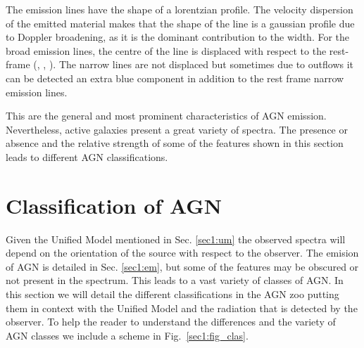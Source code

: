 The emission lines have the shape of a lorentzian profile. The velocity dispersion of the emitted material makes that the shape of the line is a gaussian profile due to Doppler broadening, as it is the dominant contribution to the width. For the broad emission lines, the centre of the line is displaced with respect to the rest-frame (\citealt{sulentic00}, \citealt{steinhardt12}, \citealt{gaskell13}). The narrow lines are not displaced but sometimes due to outflows it can be detected an extra blue component in addition to the rest frame narrow emission lines.  

This are the general and most prominent characteristics of AGN emission. Nevertheless, active galaxies present a great variety of spectra. The presence or absence and the relative strength of some of the features shown in this section leads to different AGN classifications.






\section{Classification of AGN}
\label{sec1:class}


Given the Unified Model mentioned in Sec. \ref{sec1:um} the observed spectra will depend on the orientation of the source with respect to the observer. The emision of AGN is detailed in  Sec. \ref{sec1:em}, but some of the features may be obscured or not present in the spectrum. This leads to a vast variety of classes of AGN. In this section we will detail the different classifications in the AGN zoo putting them in context with the Unified Model and the radiation that is detected by the observer. To help the reader to understand the differences and the variety of AGN classes we include a scheme in Fig.~\ref{sec1:fig_clas}.



